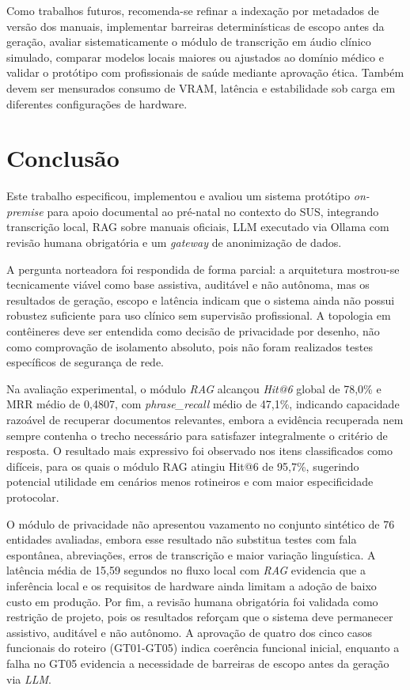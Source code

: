 \documentclass[12pt]{article}
\begin{document}
Como trabalhos futuros, recomenda-se refinar a indexação por metadados de versão dos manuais, implementar barreiras determinísticas de escopo antes da geração, avaliar sistematicamente o módulo de transcrição em áudio clínico simulado, comparar modelos locais maiores ou ajustados ao domínio médico e validar o protótipo com profissionais de saúde mediante aprovação ética.
Também devem ser mensurados consumo de VRAM, latência e estabilidade sob carga em diferentes configurações de hardware.



\section{Conclusão}\label{sec:conc}

Este trabalho especificou, implementou e avaliou um sistema protótipo \textit{on-premise} para apoio documental ao pré-natal no contexto do SUS, integrando transcrição local, RAG sobre manuais oficiais, LLM executado via Ollama com revisão humana obrigatória e um \textit{gateway} de anonimização de dados.

A pergunta norteadora foi respondida de forma parcial:
a arquitetura mostrou-se tecnicamente viável como base assistiva, auditável e não autônoma, mas os resultados de geração, escopo e latência indicam que o sistema ainda não possui robustez suficiente para uso clínico sem supervisão profissional.
A topologia em contêineres deve ser entendida como decisão de privacidade por desenho, não como comprovação de isolamento absoluto, pois não foram realizados testes específicos de segurança de rede.

Na avaliação experimental, o módulo \textit{RAG} alcançou \textit{Hit@6} global de 78,0\% e MRR médio de 0,4807, com \textit{phrase\_recall} médio de 47,1\%, indicando capacidade razoável de recuperar documentos relevantes, embora a evidência recuperada nem sempre contenha o trecho necessário para satisfazer integralmente o critério de resposta.
O resultado mais expressivo foi observado nos itens classificados como difíceis, para os quais o módulo RAG atingiu Hit@6 de 95,7\%, sugerindo potencial utilidade em cenários menos rotineiros e com maior especificidade protocolar.

O módulo de privacidade não apresentou vazamento no conjunto sintético de 76 entidades avaliadas, embora esse resultado não substitua testes com fala espontânea, abreviações, erros de transcrição e maior variação linguística.
A latência média de 15,59 segundos no fluxo local com \textit{RAG} evidencia que a inferência local e os requisitos de hardware ainda limitam a adoção de baixo custo em produção.
Por fim, a revisão humana obrigatória foi validada como restrição de projeto, pois os resultados reforçam que o sistema deve permanecer assistivo, auditável e não autônomo.
A aprovação de quatro dos cinco casos funcionais do roteiro (GT01-GT05) indica coerência funcional inicial, enquanto a falha no GT05 evidencia a necessidade de barreiras de escopo antes da geração via \textit{LLM}.
\end{document}
